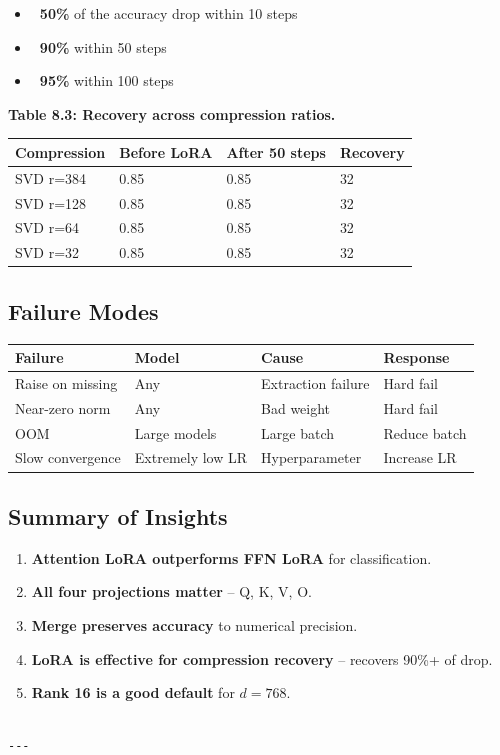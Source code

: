 \begin{itemize}
\item \textbf{~50\%} of the accuracy drop within 10 steps
\item \textbf{~90\%} within 50 steps
\item \textbf{~95\%} within 100 steps

\end{itemize}
\textbf{Table 8.3: Recovery across compression ratios.}

\begin{table}[H]
\centering
\small
\begin{tabular}{llll}
\toprule
\textbf{Compression} & \textbf{Before LoRA} & \textbf{After 50 steps} & \textbf{Recovery} \\
\midrule
SVD r=384 & 0.85 & 0.85 & 32 \\
SVD r=128 & 0.85 & 0.85 & 32 \\
SVD r=64 & 0.85 & 0.85 & 32 \\
SVD r=32 & 0.85 & 0.85 & 32 \\
\bottomrule
\end{tabular}
\end{table}

\subsection{Failure Modes}

\begin{table}[H]
\centering
\small
\begin{tabular}{llll}
\toprule
\textbf{Failure} & \textbf{Model} & \textbf{Cause} & \textbf{Response} \\
\midrule
Raise on missing & Any & Extraction failure & Hard fail \\
Near-zero norm & Any & Bad weight & Hard fail \\
OOM & Large models & Large batch & Reduce batch \\
Slow convergence & Extremely low LR & Hyperparameter & Increase LR \\
\bottomrule
\end{tabular}
\end{table}

\subsection{Summary of Insights}

\begin{enumerate}
\item \textbf{Attention LoRA outperforms FFN LoRA} for classification.
\item \textbf{All four projections matter} -- Q, K, V, O.
\item \textbf{Merge preserves accuracy} to numerical precision.
\item \textbf{LoRA is effective for compression recovery} -- recovers 90\%+ of drop.
\item \textbf{Rank 16 is a good default} for $d = 768$.
\end{enumerate}
\begin{lstlisting}

---
\end{lstlisting}